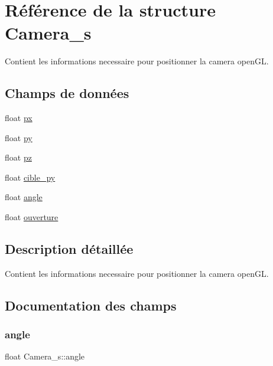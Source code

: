 \hypertarget{struct_camera__s}{}\section{Référence de la structure Camera\+\_\+s}
\label{struct_camera__s}


Contient les informations necessaire pour positionner la camera open\+GL.  


\subsection*{Champs de données}
\begin{DoxyCompactItemize}
\item 
float \hyperlink{struct_camera__s_a9d7dbf683174c3264b44409071db6569}{px}
\item 
float \hyperlink{struct_camera__s_a5512b12007600db0cd53ee8b4bea0e06}{py}
\item 
float \hyperlink{struct_camera__s_af7d42d26829bcdd288cc1fe2bd53e2d4}{pz}
\item 
float \hyperlink{struct_camera__s_ab114eea48a0a3a97349ee604f0706dac}{cible\+\_\+py}
\item 
float \hyperlink{struct_camera__s_a3002762447970119e0288e89fcf699f0}{angle}
\item 
float \hyperlink{struct_camera__s_ae83a4764a575d421af71ff8ce2969232}{ouverture}
\end{DoxyCompactItemize}


\subsection{Description détaillée}
Contient les informations necessaire pour positionner la camera open\+GL. 

\subsection{Documentation des champs}
\mbox{\label{struct_camera__s_a3002762447970119e0288e89fcf699f0}} 
\subsubsection{\texorpdfstring{angle}{angle}}
{\footnotesize\ttfamily float Camera\+\_\+s\+::angle}

